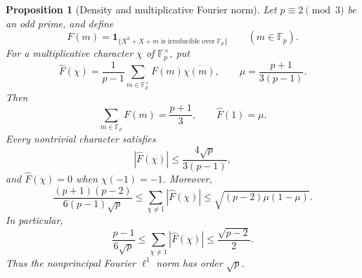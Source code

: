 \documentclass[11pt]{article}
\newtheorem{proposition}[theorem]{Proposition}
\theoremstyle{definition}
\theoremstyle{remark}
\begin{document}
\begin{proposition}[Density and multiplicative Fourier norm]
\label{prop:cubic-fourier-norm}
Let $p\equiv2\pmod3$ be an odd prime, and define
\[
 F(m)=\boldsymbol 1_{\{X^3+X+m\text{ is irreducible over }\mathbb F_p\}}
 \qquad(m\in\mathbb F_p).
\]
For a multiplicative character $\chi$ of $\mathbb F_p^\times$, put
\[
 \widehat F(\chi)=\frac1{p-1}
    \sum_{m\in\mathbb F_p^\times}F(m)\overline{\chi(m)},
 \qquad
 \mu=\frac{p+1}{3(p-1)}.
\]
Then
\[
 \sum_{m\in\mathbb F_p}F(m)=\frac{p+1}{3},
 \qquad \widehat F(1)=\mu.
\]
Every nontrivial character satisfies
\[
 |\widehat F(\chi)|\le\frac{4\sqrt p}{3(p-1)},
\]
and $\widehat F(\chi)=0$ when $\chi(-1)=-1$.
Moreover,
\[
 \frac{(p+1)(p-2)}{6(p-1)\sqrt p}
 \le \sum_{\chi\ne1}|\widehat F(\chi)|
 \le \sqrt{(p-2)\mu(1-\mu)}.
\]
In particular,
\[
 \frac{p-1}{6\sqrt p}
 \le \sum_{\chi\ne1}|\widehat F(\chi)|
 \le \frac{\sqrt{p-2}}2.
\]
Thus the nonprincipal Fourier $\ell^1$ norm has order $\sqrt p$.
\end{proposition}
\end{document}
